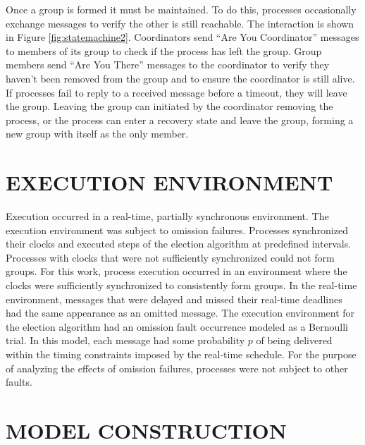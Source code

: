 Once a group is formed it must be maintained.
To do this, processes occasionally exchange messages to verify the other is still reachable.
The interaction is shown in Figure \ref{fig:statemachine2}.
Coordinators send ``Are You Coordinator'' messages to members of its group to check if the process has left the group.
Group members send ``Are You There'' messages to the coordinator to verify they haven't been removed from the group and to ensure the coordinator is still alive.
If processes fail to reply to a received message before a timeout, they will leave the group.
Leaving the group can initiated by the coordinator removing the process, or the process can enter a recovery state and leave the group, forming a new group with itself as the only member.

\section{EXECUTION ENVIRONMENT}

Execution occurred in a real-time, partially synchronous environment.
The execution environment was subject to omission failures.
Processes synchronized their clocks and executed steps of the election algorithm at predefined intervals.
Processes with clocks that were not sufficiently synchronized could not form groups.
For this work, process execution occurred in an environment where the clocks were sufficiently synchronized to consistently form groups.
In the real-time environment, messages that were delayed and missed their real-time deadlines had the same appearance as an omitted message.
The execution environment for the election algorithm had an omission fault occurrence modeled as a Bernoulli trial.
In this model, each message had some probability $p$ of being delivered within the timing constraints imposed by the real-time schedule.
For the purpose of analyzing the effects of omission failures, processes were not subject to other faults.

\section{MODEL CONSTRUCTION}

